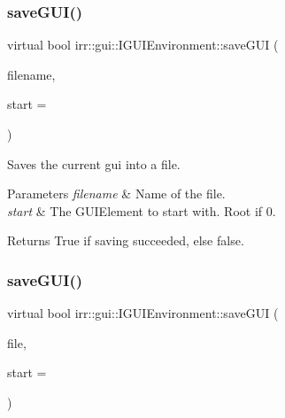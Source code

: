 \subsubsection{\texorpdfstring{save\+G\+U\+I()}{saveGUI()}\hspace{0.1cm}{\footnotesize\ttfamily [2/4]}}
{\footnotesize\ttfamily virtual bool irr\+::gui\+::\+I\+G\+U\+I\+Environment\+::save\+G\+UI (\begin{DoxyParamCaption}\item[{const \hyperlink{namespaceirr_1_1io_a6468281622ce3a1c46b72e19f32dded5}{io\+::path} \&}]{filename,  }\item[{\hyperlink{classirr_1_1gui_1_1IGUIElement}{I\+G\+U\+I\+Element} $\ast$}]{start = {} }\end{DoxyParamCaption})\hspace{0.3cm}{\ttfamily [pure virtual]}}



Saves the current gui into a file. 


\begin{DoxyParams}{Parameters}
{\em filename} & Name of the file. \\
\hline
{\em start} & The G\+U\+I\+Element to start with. Root if 0. \\
\hline
\end{DoxyParams}
\begin{DoxyReturn}{Returns}
True if saving succeeded, else false. 
\end{DoxyReturn}
\mbox{\label{classirr_1_1gui_1_1IGUIEnvironment_a39fdeef8455813a2be2bce9212ec758a}} 
\subsubsection{\texorpdfstring{save\+G\+U\+I()}{saveGUI()}\hspace{0.1cm}{\footnotesize\ttfamily [3/4]}}
{\footnotesize\ttfamily virtual bool irr\+::gui\+::\+I\+G\+U\+I\+Environment\+::save\+G\+UI (\begin{DoxyParamCaption}\item[{\hyperlink{classirr_1_1io_1_1IWriteFile}{io\+::\+I\+Write\+File} $\ast$}]{file,  }\item[{\hyperlink{classirr_1_1gui_1_1IGUIElement}{I\+G\+U\+I\+Element} $\ast$}]{start = {} }\end{DoxyParamCaption})\hspace{0.3cm}{\ttfamily [pure virtual]}}



